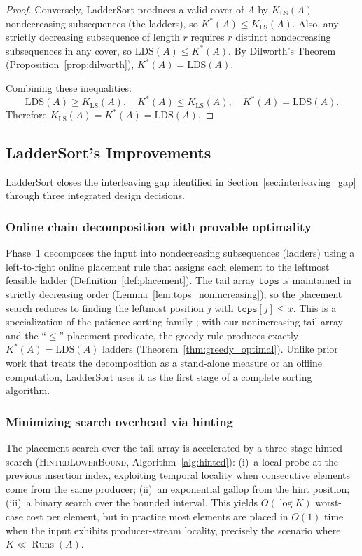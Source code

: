 \documentclass[12pt,a4paper]{article}
\theoremstyle{plain}
\theoremstyle{definition}
\DeclareMathOperator{\Runs}{Runs}
\newcommand{\tops}{\texttt{tops}}
\begin{document}
\begin{proof}
Conversely, LadderSort produces a valid cover of $A$ by $K_{\mathrm{LS}}(A)$ nondecreasing
subsequences (the ladders), so $K^*(A) \le K_{\mathrm{LS}}(A)$.
Also, any strictly decreasing subsequence of length $r$ requires $r$ distinct nondecreasing
subsequences in any cover, so $\mathrm{LDS}(A) \le K^*(A)$.
By Dilworth's Theorem (Proposition~\ref{prop:dilworth}), $K^*(A) = \mathrm{LDS}(A)$.

Combining these inequalities:
\[ \mathrm{LDS}(A) \ge K_{\mathrm{LS}}(A), \quad K^*(A) \le K_{\mathrm{LS}}(A), \quad K^*(A) = \mathrm{LDS}(A). \]
Therefore $K_{\mathrm{LS}}(A) = K^*(A) = \mathrm{LDS}(A)$.
\end{proof}

\subsection{LadderSort's Improvements}
\label{sec:improvements}

LadderSort closes the interleaving gap identified in
Section~\ref{sec:interleaving_gap} through three integrated design
decisions.

\subsubsection{Online chain decomposition with provable optimality}
Phase~1 decomposes the input into nondecreasing subsequences (ladders) using
a left-to-right online placement rule that assigns each element to the
leftmost feasible ladder (Definition~\ref{def:placement}).  The tail array
$\tops$ is maintained in strictly decreasing order
(Lemma~\ref{lem:tops_nonincreasing}), so the placement search reduces to
finding the leftmost position $j$ with $\tops[j] \le x$.  This is a
specialization of the patience-sorting family \cite{AldousDiaconis1999};
with our nonincreasing tail array and the ``$\le$'' placement predicate,
the greedy rule produces exactly $K^*(A) = \mathrm{LDS}(A)$ ladders
(Theorem~\ref{thm:greedy_optimal}).  Unlike prior work that treats the
decomposition as a stand-alone measure or an offline computation, LadderSort
uses it as the first stage of a complete sorting algorithm.

\subsubsection{Minimizing search overhead via hinting}
The placement search over the tail array is accelerated by a three-stage
hinted search (\textsc{HintedLowerBound}, Algorithm~\ref{alg:hinted}):
(i)~a local probe at the previous insertion index, exploiting temporal
locality when consecutive elements come from the same producer;
(ii)~an exponential gallop from the hint position;
(iii)~a binary search over the bounded interval.  This yields $O(\log K)$
worst-case cost per element, but in practice most elements are placed in
$O(1)$ time when the input exhibits producer-stream locality, precisely the
scenario where $K \ll \Runs(A)$.
\end{document}
